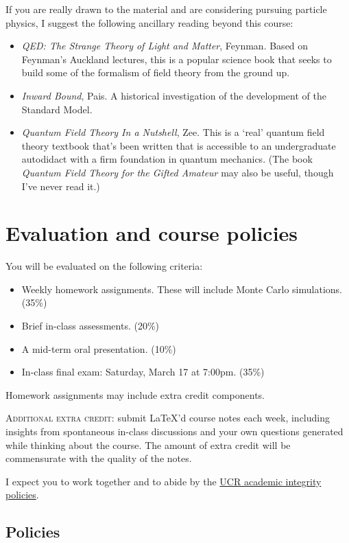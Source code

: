 \documentclass[12pt]{article}
\numberwithin{equation}{section}    %
\begin{document}
If you are really drawn to the material and are considering pursuing particle physics, I suggest the following ancillary reading beyond this course:
\begin{itemize}
	\item \emph{QED: The Strange Theory of Light and Matter}, Feynman. Based on Feynman's Auckland lectures, this is a popular science book that seeks to build some of the formalism of field theory from the ground up. 
	\item \emph{Inward Bound}, Pais. A historical investigation of the development of the Standard Model. 
	\item \emph{Quantum Field Theory In a Nutshell}, Zee. This is a `real' quantum field theory textbook that's been written that is accessible to an undergraduate autodidact with a firm foundation in quantum mechanics. (The book \emph{Quantum Field Theory for the Gifted Amateur} may also be useful, though I've never read it.) 
\end{itemize}

\section*{Evaluation and course policies}

You will be evaluated on the following criteria:
\begin{itemize}
	\item Weekly homework assignments. These will include Monte Carlo simulations. (35\%)
	\item Brief in-class assessments. (20\%)
	\item A mid-term oral presentation. (10\%)
	\item In-class final exam: Saturday, March 17 at 7:00pm. (35\%)
\end{itemize}
Homework assignments may include extra credit components. 

\vspace{1em}
\noindent \textsc{Additional extra credit}: submit \LaTeX'd course notes each week, including insights from spontaneous in-class discussions and your own questions generated while thinking about the course. The amount of extra credit will be commensurate with the quality of the notes.

\vspace{1em}
\noindent I expect you to work together and to abide by the \href{http://conduct.ucr.edu/policies/academicintegrity.html}{UCR academic integrity policies}.

\subsection*{Policies}
\end{document}
